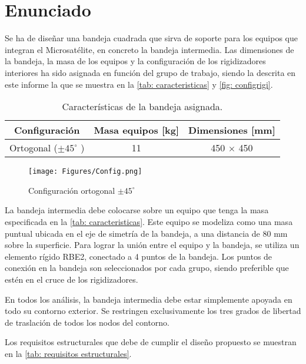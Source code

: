 \section{Enunciado}

Se ha de diseñar una bandeja cuadrada que sirva de soporte para los equipos que integran el Microsatélite, en concreto la bandeja intermedia. Las dimensiones de la bandeja, la masa de los equipos y la configuración de los rigidizadores interiores ha sido asignada en función del grupo de trabajo, siendo la descrita en este informe la que se muestra en la \autoref{tab: caracteristicas} y \autoref{fig: configrigi}.

\begin{table}[H]
\centering
\caption{Características de la bandeja asignada.}
\label{tab: caracteristicas}
\begin{tabular}{l c c}
\toprule
\multicolumn{1}{c}{\textbf{Configuración}}  & \multicolumn{1}{c}{\textbf{Masa equipos} [kg]} & \multicolumn{1}{c}{\textbf{Dimensiones} [mm]} \\ \midrule
  Ortogonal ($\pm 45^{\circ}$ )  & 11  & 450 $\times$ 450 \\ \bottomrule
\end{tabular}
\end{table}

\begin{figure}[H]
    \centering
    \texttt{[image: Figures/Config.png]}
    \caption{Configuración ortogonal $\pm 45^{\circ}$}
    \label{fig: configrigi}
\end{figure}

La bandeja intermedia debe colocarse sobre un equipo que tenga la masa especificada en la \autoref{tab: caracteristicas}. Este equipo se modeliza como una masa puntual ubicada en el eje de simetría de la bandeja, a una distancia de 80 mm sobre la superficie. Para lograr la unión entre el equipo y la bandeja, se utiliza un elemento rígido RBE2, conectado a 4 puntos de la bandeja. Los puntos de conexión en la bandeja son seleccionados por cada grupo, siendo preferible que estén en el cruce de los rigidizadores.

En todos los análisis, la bandeja intermedia debe estar simplemente apoyada en todo su contorno exterior. Se restringen exclusivamente los tres grados de libertad de traslación de todos los nodos del contorno.

Los requisitos estructurales que debe de cumplir el diseño propuesto se muestran en la \autoref{tab: requisitos estructurales}.

